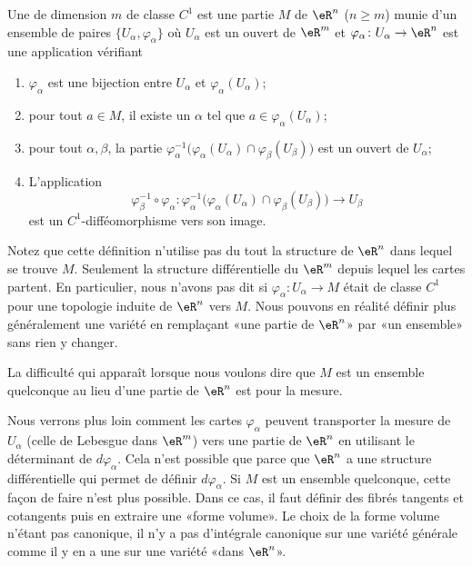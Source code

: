 \begin{definition}		\label{DEFooJOAHooAxcLHe}
	Une  de dimension \( m\) de classe \( C^1\) est une partie \( M\) de \( \eR^n\) (\( n\geq m\)) munie d'un ensemble de paires \( \{ U_{\alpha},\varphi_{\alpha} \}\) où \( U_{\alpha}\) est un ouvert de \( \eR^m\) et \( \varphi_{\alpha}\colon U_{\alpha}\to \eR^n\) est une application vérifiant
	\begin{enumerate}
		\item
		      \( \varphi_{\alpha}\) est une bijection entre \( U_{\alpha}\) et \( \varphi_{\alpha}(U_{\alpha})\);
		\item
		      pour tout \( a\in M\), il existe un \( \alpha\) tel que \( a\in\varphi_{\alpha}(U_{\alpha})\);
		\item
		      pour tout \( \alpha,\beta\), la partie \( \varphi_{\alpha}^{-1}\big( \varphi_{\alpha}(U_{\alpha})\cap \varphi_{\beta}(U_{\beta}) \big)\) est un ouvert de \( U_{\alpha}\);
		\item
		      L'application
		      \begin{equation}
			      \varphi_{\beta}^{-1}\circ \varphi_{\alpha}\colon \varphi_{\alpha}^{-1}\big( \varphi_{\alpha}(U_{\alpha})\cap \varphi_{\beta}(U_{\beta}) \big)\to U_{\beta}
		      \end{equation}
		      est un \( C^1\)-difféomorphisme vers son image.
	\end{enumerate}
\end{definition}

Notez que cette définition n'utilise pas du tout la structure de \( \eR^n\) dans lequel se trouve \( M\). Seulement la structure différentielle du \( \eR^m\) depuis lequel les cartes partent. En particulier, nous n'avons pas dit si \( \varphi_{\alpha}\colon U_{\alpha}\to M\) était de classe \( C^1\) pour une topologie induite de \( \eR^n\) vers \( M\). Nous pouvons en réalité définir plus généralement une variété en remplaçant «une partie de \( \eR^n\)» par «un ensemble» sans rien y changer.

La difficulté qui apparaît lorsque nous voulons dire que \( M\) est un ensemble quelconque au lieu d'une partie de \( \eR^n\) est pour la mesure.

Nous verrons plus loin comment les cartes \( \varphi_{\alpha}\) peuvent transporter la mesure de \( U_{\alpha}\) (celle de Lebesgue dans \( \eR^m\)) vers une partie de \( \eR^n\) en utilisant le déterminant de \( d\varphi_{\alpha}\). Cela n'est possible que parce que \( \eR^n\) a une structure différentielle qui permet de définir \( d\varphi_{\alpha}\). Si \( M\) est un ensemble quelconque, cette façon de faire n'est plus possible. Dans ce cas, il faut définir des fibrés tangents et cotangents puis en extraire une «forme volume». Le choix de la forme volume n'étant pas canonique, il n'y a pas d'intégrale canonique sur une variété générale comme il y en a une sur une variété «dans \( \eR^n\)».

